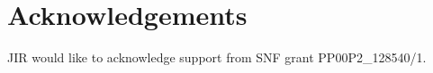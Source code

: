 \section{Acknowledgements}
\appendix
JIR would like to acknowledge support from SNF grant PP00P2\_128540/1.


